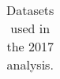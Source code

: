 \begin{table}[h]
\begin{tabular}{|l|l|l|}
\hline %
\hline %
     \end{tabular}
\small
    \caption{ Datasets used in the 2017 analysis. }
    \label{tab:datasets_dataB}
\end{table}


